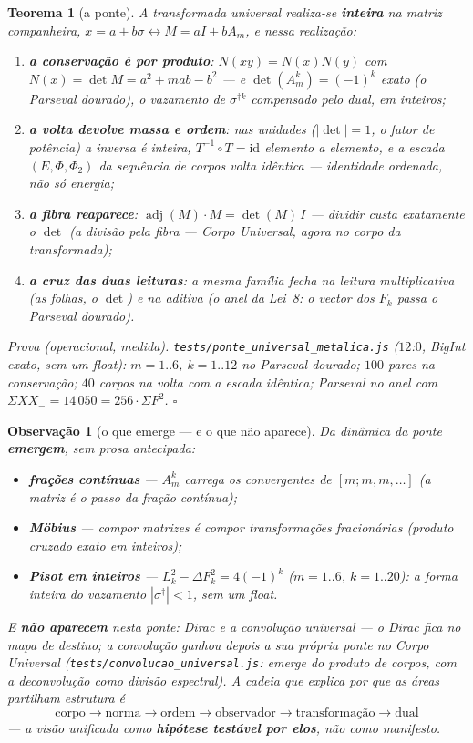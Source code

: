 \documentclass[11pt,a4paper]{article}
\newtheorem{teorema}{Teorema}
\newtheorem{observacao}{Observação}
\newcommand{\code}[1]{\texttt{#1}}
\begin{document}
\begin{teorema}[a ponte]\label{thm:ponte-universal}
A transformada universal realiza-se \textbf{inteira} na matriz
companheira, $x=a+b\sigma\leftrightarrow M=aI+bA_m$, e nessa realização:
\begin{enumerate}
\item \textbf{a conservação é por produto}:
$N(xy)=N(x)N(y)$ com $N(x)=\det M=a^{2}+mab-b^{2}$ --- e
$\det(A_m^{k})=(-1)^{k}$ exato (o Parseval dourado), o vazamento de
$\sigma^{\dagger k}$ compensado pelo dual, em inteiros;
\item \textbf{a volta devolve massa e ordem}: nas unidades ($|\det|=1$,
o fator de potência) a inversa é inteira, $T^{-1}\!\circ T=\mathrm{id}$
elemento a elemento, e a escada $(E,\Phi,\Phi_2)$ da sequência de corpos
volta \emph{idêntica} --- identidade ordenada, não só energia;
\item \textbf{a fibra reaparece}: $\operatorname{adj}(M)\cdot M=\det(M)\,I$
--- dividir custa exatamente o $\det$ (a divisão pela fibra ---
\emph{Corpo Universal}, agora no corpo da transformada);
\item \textbf{a cruz das duas leituras}: a mesma família fecha na
leitura multiplicativa (as folhas, o $\det$) e na aditiva (o anel da
Lei~8: o vector dos $F_k$ passa o Parseval dourado).
\end{enumerate}
\emph{Prova (operacional, medida).} \code{tests/ponte\_universal\_metalica.js}
($12$:$0$, BigInt exato, sem um float): $m=1..6$, $k=1..12$ no
Parseval dourado; $100$ pares na conservação; $40$ corpos na volta com
a escada idêntica; Parseval no anel com
$\Sigma XX_{-}=14\,050=256\cdot\Sigma F^{2}$. $\square$
\end{teorema}

\begin{observacao}[o que emerge --- e o que não aparece]\label{obs:emerge}
Da dinâmica da ponte \textbf{emergem}, sem prosa antecipada:
\begin{itemize}
\item \textbf{frações contínuas} --- $A_m^{k}$ \emph{carrega} os
convergentes de $[m;m,m,\ldots]$ (a matriz é o passo da fração
contínua);
\item \textbf{Möbius} --- compor matrizes é compor transformações
fracionárias (produto cruzado exato em inteiros);
\item \textbf{Pisot em inteiros} --- $L_k^{2}-\Delta F_k^{2}=4(-1)^{k}$
($m=1..6$, $k=1..20$): a forma inteira do vazamento $|\sigma^{\dagger}|<1$,
sem um float.
\end{itemize}
E \textbf{não aparecem} nesta ponte: Dirac e a convolução universal ---
o Dirac fica no \emph{mapa de destino}; a convolução ganhou depois a
sua própria ponte no \emph{Corpo Universal}
(\code{tests/convolucao\_universal.js}: emerge do produto de corpos,
com a deconvolução como divisão espectral).
A cadeia que explica por que as áreas partilham estrutura é
\[
\boxed{
\text{corpo}\to\text{norma}\to\text{ordem}\to\text{observador}
\to\text{transformação}\to\text{dual}
}
\]
--- a visão unificada como \textbf{hipótese testável por elos}, não como
manifesto.
\end{observacao}
\end{document}
